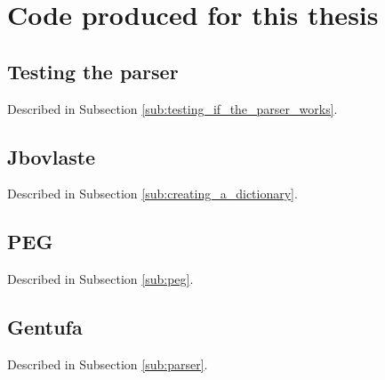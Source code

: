 \chapter{Code produced for this thesis}

\section{Testing the parser}
\label{appendix:testing_the_parser}

Described in Subsection \ref{sub:testing_if_the_parser_works}.



\newpage

\section{Jbovlaste}
\label{appendix:jbovlaste-annex}

Described in Subsection \ref{sub:creating_a_dictionary}.



\newpage

\section{PEG}
\label{appendix:peg-annex}

Described in Subsection \ref{sub:peg}.



\newpage

\section{Gentufa}
\label{appendix:gentufa-annex}

Described in Subsection \ref{sub:parser}.



